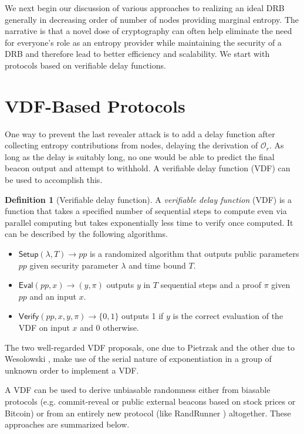\documentclass[letterpaper,twocolumn,10pt]{article}
\theoremstyle{definition}
\newtheorem{definition}[theorem]{Definition}
\theoremstyle{remark}
\begin{document}
We next begin our discussion of various approaches to realizing an ideal DRB generally in decreasing order of number of nodes providing marginal entropy. The narrative is that a novel dose of cryptography can often help eliminate the need for everyone's role as an entropy provider while maintaining the security of a DRB and therefore lead to better efficiency and scalability. We start with protocols based on verifiable delay functions.

\section{VDF-Based Protocols}
\label{section:vdf}
One way to prevent the last revealer attack is to add a delay function after collecting entropy contributions from nodes, delaying the derivation of $\mathcal{O}_r$. As long as the delay is suitably long, no one would be able to predict the final beacon output and attempt to withhold. A verifiable delay function (VDF) \cite{boneh2018verifiable,boneh2018survey} can be used to accomplish this.

\begin{definition}[Verifiable delay function]
A \textit{verifiable delay function} (VDF) is a function that takes a specified number of sequential steps to compute even via parallel computing but takes exponentially less time to verify once computed. It can be described by the following algorithms.
\begin{itemize}
\item $\mathsf{Setup}(\lambda, T) \rightarrow pp$ is a randomized algorithm that outputs public parameters $pp$ given security parameter $\lambda$ and time bound $T$.
\item $\mathsf{Eval}(pp, x) \rightarrow (y, \pi)$ outputs $y$ in $T$ sequential steps and a proof $\pi$ given $pp$ and an input $x$.
\item $\mathsf{Verify}(pp, x, y, \pi) \rightarrow \{0, 1\}$ outputs 1 if $y$ is the correct evaluation of the VDF on input $x$ and 0 otherwise.
\end{itemize}
\end{definition}

The two well-regarded VDF proposals, one due to Pietrzak \cite{pietrzak2018simple} and the other due to Wesolowski \cite{wesolowski2019efficient}, make use of the serial nature of exponentiation in a group of unknown order to implement a VDF.

A VDF can be used to derive unbiasable randomness either from biasable protocols (e.g. commit-reveal or public external beacons based on stock prices or Bitcoin) or from an entirely new protocol (like RandRunner \cite{schindler2021randrunner}) altogether. These approaches are summarized below.
\end{document}
